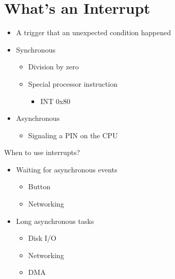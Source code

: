 \section{What's an Interrupt}

\begin{frame}{\secname}
    \begin{itemize}
        \item A trigger that an unexpected condition happened
        \item Synchronous
        \begin{itemize}
            \item Division by zero
            \item Special processor instruction
            \begin{itemize}
                \item INT 0x80
            \end{itemize}
        \end{itemize}
        \item Asynchronous
        \begin{itemize}
            \item Signaling a PIN on the CPU
        \end{itemize}
    \end{itemize}
\end{frame}

\begin{frame}{\secname}
    When to use interrupts?

    \begin{itemize}
        \item Waiting for asynchronous events
        \begin{itemize}
            \item Button
            \item Networking
        \end{itemize}
        \item Long asynchronous tasks
        \begin{itemize}
            \item Disk I/O
            \item Networking
            \item DMA
        \end{itemize}
    \end{itemize}
\end{frame}

